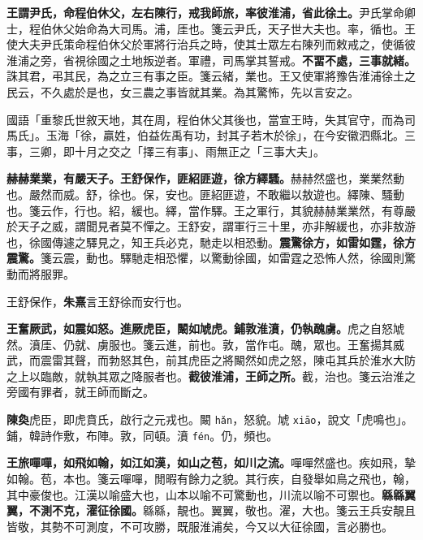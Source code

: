 \textbf{王謂尹氏，命程伯休父，左右陳行，戒我師旅，率彼淮浦，省此徐土。}{\footnotesize 尹氏掌命卿士，程伯休父始命為大司馬。浦，厓也。箋云尹氏，天子世大夫也。率，循也。王使大夫尹氏策命程伯休父於軍將行治兵之時，使其士眾左右陳列而敕戒之，使循彼淮浦之旁，省視徐國之土地叛逆者。軍禮，司馬掌其誓戒。}\textbf{不畱不處，三事就緒。}{\footnotesize 誅其君，弔其民，為之立三有事之臣。箋云緒，業也。王又使軍將豫告淮浦徐土之民云，不久處於是也，女三農之事皆就其業。為其驚怖，先以言安之。}

\begin{quoting}國語「重黎氏世敘天地，其在周，程伯休父其後也，當宣王時，失其官守，而為司馬氏」。玉海「徐，贏姓，伯益佐禹有功，封其子若木於徐」，在今安徽泗縣北。三事，三卿，即十月之交之「擇三有事」、雨無正之「三事大夫」。\end{quoting}

\textbf{赫赫業業，有嚴天子。王舒保作，匪紹匪遊，徐方繹騷。}{\footnotesize 赫赫然盛也，業業然動也。嚴然而威。舒，徐也。保，安也。匪紹匪遊，不敢繼以敖遊也。繹陳、騷動也。箋云作，行也。紹，緩也。繹，當作驛。王之軍行，其貌赫赫業業然，有尊嚴於天子之威，謂聞見者莫不憚之。王舒安，謂軍行三十里，亦非解緩也，亦非敖游也，徐國傳遽之驛見之，知王兵必克，馳走以相恐動。}\textbf{震驚徐方，如雷如霆，徐方震驚。}{\footnotesize 箋云震，動也。驛馳走相恐懼，以驚動徐國，如雷霆之恐怖人然，徐國則驚動而將服罪。}

\begin{quoting}王舒保作，\textbf{朱熹}言王舒徐而安行也。\end{quoting}

\textbf{王奮厥武，如震如怒。進厥虎臣，闞如虓虎。鋪敦淮濆，仍執醜虜。}{\footnotesize 虎之自怒虓然。濆厓、仍就、虜服也。箋云進，前也。敦，當作屯。醜，眾也。王奮揚其威武，而震雷其聲，而勃怒其色，前其虎臣之將闞然如虎之怒，陳屯其兵於淮水大防之上以臨敵，就執其眾之降服者也。}\textbf{截彼淮浦，王師之所。}{\footnotesize 截，治也。箋云治淮之旁國有罪者，就王師而斷之。}

\begin{quoting}\textbf{陳奐}虎臣，即虎賁氏，啟行之元戎也。闞 \texttt{hǎn}，怒貌。虓 \texttt{xiāo}，說文「虎鳴也」。鋪，韓詩作敷，布陣。敦，同頓。濆 \texttt{fén}。仍，頻也。\end{quoting}

\textbf{王旅嘽嘽，如飛如翰，如江如漢，如山之苞，如川之流。}{\footnotesize 嘽嘽然盛也。疾如飛，摯如翰。苞，本也。箋云嘽嘽，閒暇有餘力之貌。其行疾，自發舉如鳥之飛也，翰，其中豪俊也。江漢以喻盛大也，山本以喻不可驚動也，川流以喻不可禦也。}\textbf{緜緜翼翼，不測不克，濯征徐國。}{\footnotesize 緜緜，靚也。翼翼，敬也。濯，大也。箋云王兵安靚且皆敬，其勢不可測度，不可攻勝，既服淮浦矣，今又以大征徐國，言必勝也。}

